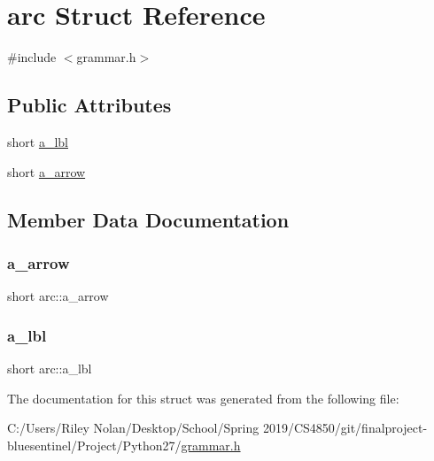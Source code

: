 \hypertarget{structarc}{}\section{arc Struct Reference}
\label{structarc}


{\ttfamily \#include $<$grammar.\+h$>$}

\subsection*{Public Attributes}
\begin{DoxyCompactItemize}
\item 
short \mbox{\hyperlink{structarc_a2febdfa7daf772d89eaa0951933dbf74}{a\+\_\+lbl}}
\item 
short \mbox{\hyperlink{structarc_afbb7259f5917c22500ffce95ed89f644}{a\+\_\+arrow}}
\end{DoxyCompactItemize}


\subsection{Member Data Documentation}
\mbox{\label{structarc_afbb7259f5917c22500ffce95ed89f644}} 
\subsubsection{\texorpdfstring{a\_arrow}{a\_arrow}}
{\footnotesize\ttfamily short arc\+::a\+\_\+arrow}

\mbox{\label{structarc_a2febdfa7daf772d89eaa0951933dbf74}} 
\subsubsection{\texorpdfstring{a\_lbl}{a\_lbl}}
{\footnotesize\ttfamily short arc\+::a\+\_\+lbl}



The documentation for this struct was generated from the following file\+:\begin{DoxyCompactItemize}
\item 
C\+:/\+Users/\+Riley Nolan/\+Desktop/\+School/\+Spring 2019/\+C\+S4850/git/finalproject-\/bluesentinel/\+Project/\+Python27/\mbox{\hyperlink{grammar_8h}{grammar.\+h}}\end{DoxyCompactItemize}
